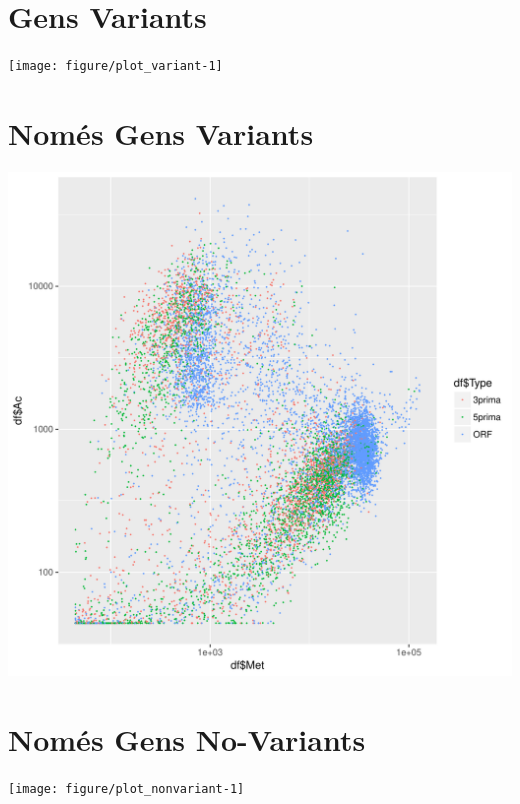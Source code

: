 \documentclass{article}\usepackage[]{graphicx}\usepackage[]{color}
\makeatletter
\def\maxwidth{ %
  \ifdim\Gin@nat@width>\linewidth
    \linewidth
  \else
    \Gin@nat@width
  \fi
}
\newenvironment{knitrout}{}{} %
\makeatother
\begin{document}
\section{Gens Variants}
\begin{knitrout}
\color{fgcolor}
\texttt{[image: figure/plot\_variant-1]} 

\end{knitrout}
\clearpage
\section{Només Gens Variants}
\begin{knitrout}
\color{fgcolor}
\includegraphics[width=\maxwidth]{figure/plot_onlyvariant-1} 

\end{knitrout}
\clearpage
\section{Només Gens No-Variants}
\begin{knitrout}
\color{fgcolor}
\texttt{[image: figure/plot\_nonvariant-1]} 

\end{knitrout}
\clearpage
\end{document}
